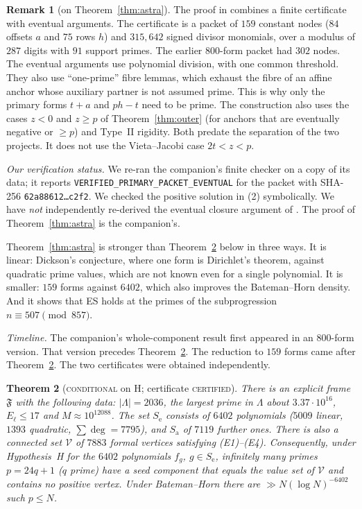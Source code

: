 \documentclass[11pt,reqno]{amsart}
\newtheorem{theorem}{Theorem}[section]
\theoremstyle{definition}
\newtheorem{remark}[theorem]{Remark}
\newcommand{\cV}{\mathcal V}
\newcommand{\cF}{\mathfrak F}
\newcommand{\Se}{S_{\mathrm e}}
\newcommand{\Sa}{S_{\mathrm a}}
\newcommand{\status}[1]{\textsc{#1}}
\begin{document}
\begin{remark}[on Theorem~\ref{thm:astra}]
The proof in \cite{AS} combines a finite certificate with eventual
arguments.  The certificate is a packet of $159$ constant nodes ($84$
offsets $a$ and $75$ rows $h$) and $315{,}642$ signed divisor monomials,
over a modulus of $287$ digits with $91$ support primes.  The earlier
$800$-form packet had $302$ nodes.  The eventual arguments use polynomial division, with
one common threshold.  They also use ``one-prime'' fibre lemmas, which
exhaust the fibre of an affine anchor whose auxiliary partner is not
assumed prime.  This is why only the primary forms $t+a$ and $ph-t$ need
to be prime.  The construction also uses the cases $z<0$ and $z\ge p$ of
Theorem~\ref{thm:outer} (for anchors that are eventually negative or
${}\ge p$) and Type~II rigidity.  Both predate the separation of the two
projects.  It does not use the Vieta--Jacobi case $2t<z<p$.

\emph{Our verification status.}  We re-ran the companion's finite checker
on a copy of its data; it reports \texttt{VERIFIED\_PRIMARY\_PACKET\_EVENTUAL}
for the packet with SHA-256 \texttt{62a88612\dots c2f2}.  We checked the
positive solution in (2) symbolically.  We have \emph{not} independently
re-derived the eventual closure argument of \cite{AS}.  The proof of
Theorem~\ref{thm:astra} is the companion's.

Theorem~\ref{thm:astra} is stronger than Theorem~\ref{thm:F} below in three
ways.  It is linear: Dickson's conjecture, where one form is Dirichlet's
theorem, against quadratic prime values, which are not known even for a
single polynomial.  It is smaller: $159$ forms against $6402$, which also
improves the Bateman--Horn density.  And it shows that ES holds at the
primes of the subprogression $n\equiv507\pmod{857}$.

\emph{Timeline.}  The companion's whole-component result first appeared in
an $800$-form version.  That version precedes Theorem~\ref{thm:F}.  The
reduction to $159$ forms came after Theorem~\ref{thm:F}.  The two
certificates were obtained independently.
\end{remark}

\begin{theorem}[\status{conditional} on H; certificate \status{certified}]\label{thm:F}
There is an explicit frame $\cF$ with the following data: $|\Lambda|=2036$,
the largest prime in $\Lambda$ about $3.37\cdot10^{16}$, $E_\ell\le17$ and
$M\approx10^{12088}$.  The set $\Se$ consists of $6402$ polynomials ($5009$
linear, $1393$ quadratic, $\sum\deg=7795$), and $\Sa$ of $7119$ further
ones.  There is also a connected set $\cV$ of $7883$ formal vertices
satisfying (E1)--(E4).  Consequently, under Hypothesis~H for the $6402$
polynomials $f_g$, $g\in\Se$, infinitely many primes $p=24q+1$ ($q$ prime)
have a seed component that equals the value set of $\cV$ and contains no
positive vertex.  Under Bateman--Horn there are
$\gg N(\log N)^{-6402}$ such $p\le N$.
\end{theorem}
\end{document}
